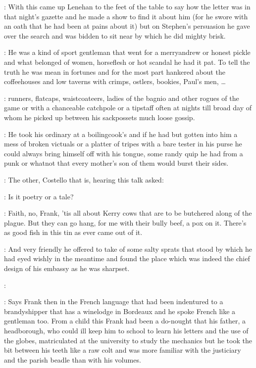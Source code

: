 \documentclass[12pt]{article}
\begin{document}


: With this came up Lenehan to the feet of the table to say how the letter
was in that night's gazette and he made a show to find it about him (for
he swore with an oath that he had been at pains about it) but on
Stephen's persuasion he gave over the search and was bidden to sit near
by which he did mighty brisk.

: He was a kind of sport gentleman that went for a merryandrew or
honest pickle and what belonged of women, horseflesh or hot scandal he had
it pat. To tell the truth he was mean in fortunes and for the most part
hankered about the coffeehouses and low taverns with crimps, ostlers,
bookies, Paul's men, \dots

: runners, flatcaps, waistcoateers, ladies of the bagnio and other
rogues of the game or with a chanceable catchpole or a tipstaff often at
nights till broad day of whom he picked up between his sackpossets much
loose gossip.

: He took his ordinary at a boilingcook's and if he had but gotten into
him a mess of broken victuals or a platter of tripes with a bare tester in
his purse he could always bring himself off with his tongue, some randy
quip he had from a punk or whatnot that every mother's son of them would
burst their sides.

: The other, Costello that is, hearing this talk asked:

\PC: Is it poetry or a tale?

\Ln: Faith, no, Frank, 'tis all about Kerry cows that are to be butchered
along of the plague. But they can go hang, for me with their bully beef, a
pox on it. There's as good fish in this tin as ever came out of it.

: And very friendly he offered to take of some salty sprats that stood
by which he had eyed wishly in the meantime and found the place which was
indeed the chief design of his embassy as he was sharpset.

\PC: 

: Says Frank then in the French language that had been indentured to a
brandyshipper that has a winelodge in Bordeaux and he spoke French like a
gentleman too. From a child this Frank had been a do-nought that his
father, a headborough, who could ill keep him to school to learn his
letters and the use of the globes, matriculated at the university to study
the mechanics but he took the bit between his teeth like a raw colt and
was more familiar with the justiciary and the parish beadle than with his
volumes.
\end{document}
